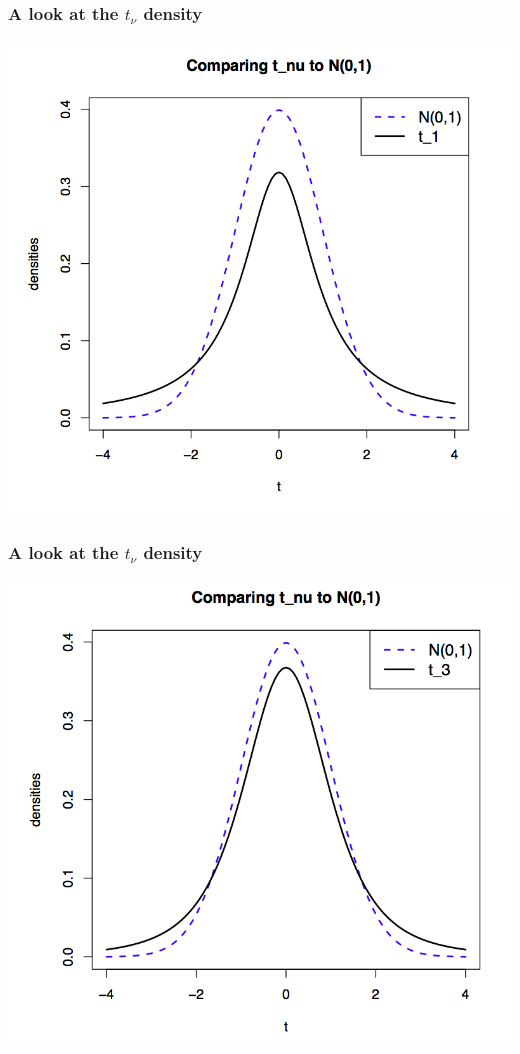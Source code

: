 \documentclass[handout]{beamer}\usepackage[]{graphicx}\usepackage[]{color}
\numberwithin{equation}{section}
\begin{document}
\begin{frame}
\frametitle{A look at the $t_\nu$ density}
 \includegraphics{../../fig/tapprox1.png}
\end{frame}
\begin{frame}
\frametitle{A look at the $t_\nu$ density}
 \includegraphics{../../fig/tapprox2.png}
\end{frame}
\end{document}

